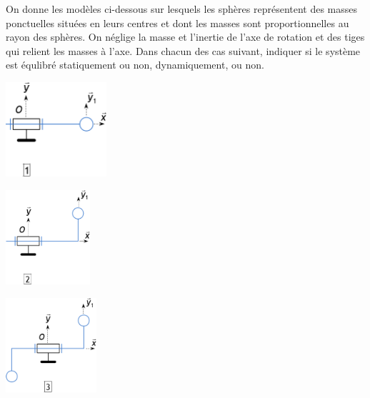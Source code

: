 \documentclass[10pt,fleqn]{article} %
\begin{document}
\def\pathfig{images}

\vspace{4cm}
\pagestyle{fancy}
\thispagestyle{plain}

\def\columnseprulecolor{\color{ocre}}
\setlength{\columnseprule}{0.4pt} 

\def\pathfig{images}
On donne les modèles ci-dessous sur lesquels les sphères représentent des
masses ponctuelles situées en leurs centres et dont les masses sont
proportionnelles au rayon des sphères. On néglige la masse et l’inertie de l’axe
de rotation et des tiges qui relient les masses à l’axe.
Dans chacun des cas suivant, indiquer si le système est équlibré statiquement ou non, dynamiquement, ou non.

\begin{multicols}{3}


\begin{center}
\includegraphics[height=3.5cm]{images/fig_01}
\end{center}

\begin{center}
\includegraphics[height=3.5cm]{images/fig_02}
\end{center}


\begin{center}
\includegraphics[height=3.5cm]{images/fig_03}
\end{center}



\end{multicols}
\end{document}
